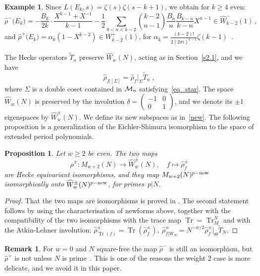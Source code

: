 \documentclass{amsart}
\theoremstyle{plain}
\newtheorem{proposition}[theorem]{Proposition}
\theoremstyle{definition}
\newtheorem{example}[theorem]{Example}
\newtheorem{remark}[theorem]{Remark}
\numberwithin{equation}{section}
\def\tr{\operatorname{Tr}}\def\id{\mathrm{Id}}
\def\SS{\Sigma}\def\D{\mathcal{D}}
\def\dd{\delta} \def\ss{\sigma}\def\wc{\widetilde{\chi}}
\def\a{\alpha}\def\b{\beta}\def\g{\gamma}
\def\sm#1#2#3#4{\left(\begin{smallmatrix}#1&#2 \\ #3 & #4 \end{smallmatrix}\right)}
\def\be{\begin{equation}}  \def\ee{\end{equation}}
\newcommand{\wT}{\widetilde{T}}
\renewcommand{\wr}{\widehat{\rho}}
\newcommand{\wW}{\widehat{W}}
\begin{document}
\begin{example}\label{ex4}
Since $L(E_k,s)=\zeta(s)\zeta(s-k+1)$, we obtain for $k\ge 4$ even:
\[ \wr^-\big(E_k\big)=-\frac{B_k}{2k}\cdot \frac{X^{k-1}+X^{-1}}{k-1}-\frac 12
 \sum_{0<n<k-2} \binom{k-2}{n-1} \frac{B_{n}}{n}\frac{B_{k-n}}{k-n} X^{n-1} 
 \in \wW_{k-2}^-(1)\,,  \]
 and $\wr^+\big(E_k\big)=\a_k (1-X^{k-2})\in W_{k-2}^+(1)$, 
 for $\a_k=\frac{(k-2)!}{2 (2\pi i)^{k-1}} \zeta(k-1)$~\cite[p. 240]{KZ}. 
\end{example}

The Hecke operators $\wT_n$ preserve $\wW_w(N)$,  acting as in Section~\ref{s2.1}, and we have 
\be \label{10}\wr_{f|[\SS]} = \wr_f|_\SS \wT_n \;, \ee
where $\SS$ is a double coset contained in $\mathcal{M}_n$ satisfying~\eqref{eq_star}. 
The space~$\wW_w(N)$ 
is preserved by the involution $\dd=\sm {-1}001$, and we denote its 
$\pm 1$ eigenspaces by $\wW_w^\pm(N)$. We define its new 
subspaces as in~\eqref{new}. The following proposition is a generalization of the Eichler-Shimura 
isomorphism to the space of extended period polynomials. 
\begin{proposition} \label{P8}
Let $w\ge 2$ be even. 
The two maps $$\wr^\pm: M_{w+2}(N)\rightarrow \wW_w^\pm(N), \quad f\mapsto \wr^\pm_f$$ 
are Hecke equivariant isomorphisms, and  
they map $M_{w+2}(N)^{p-\mathrm{new}}$ isomorphically onto $\wW_w^\pm(N)^{p-\new}$, for 
primes~$p|N$.
\end{proposition}
\begin{proof}That the two maps are isomorphisms is proved in \cite[Prop. 8.4]{PP}.
The second statement follows by using the characterisation of newforms above,
together with the compatibility of the two isomorphisms with the trace map 
$\tr=\tr^N_M$ and with the Atkin-Lehner involution: 
$
\wr_{\tr (f)}^\pm=\tr (\wr_f^\pm), \  \wr_{f|W_N}^\pm=N^{-w/2} \wr_f^\pm|_\Theta \wT_N.
$
\end{proof}
\begin{remark}
For $w=0$ and $N$ square-free the map $\wr^-$ is still an isomorphism, but $\wr^+$ is not 
unless $N$ is prime~\cite[Prop. 8.4]{PP}.
This is one of the reasons the weight 2 case is more delicate, and we avoid it in this paper. 
\end{remark}
\end{document}
